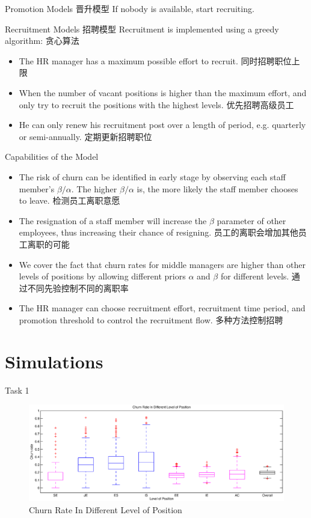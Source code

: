 \documentclass{beamer}
\begin{document}
\begin{CJK*}{UTF8}{gbsn}
\begin{frame}{Promotion Models 晋升模型}
If nobody is available, start recruiting.

\end{frame}

\begin{frame}{Recruitment Models 招聘模型}
Recruitment is implemented using a greedy algorithm: 贪心算法
\begin{itemize}
\item The HR manager has a maximum possible effort to recruit. 同时招聘职位上限
\item When the number of vacant positions is higher than the maximum effort, and only try to recruit the positions with the highest levels. 优先招聘高级员工
\item He can only renew his recruitment post over a length of period, e.g. quarterly or semi-annually. 定期更新招聘职位
\end{itemize}
\end{frame}

\begin{frame}{Capabilities of the Model}
\begin{itemize}
\item The risk of churn can be identified in early stage by observing each staff member's $\beta/\alpha$. The higher $\beta/\alpha$ is, the more likely the staff member chooses to leave. 检测员工离职意愿
\item The resignation of a staff member will increase the $\beta$ parameter of other employees, thus increasing their chance of resigning. 员工的离职会增加其他员工离职的可能
\item We cover the fact that churn rates for middle managers are higher than other levels of positions by allowing different priors $\alpha$ and $\beta$ for different levels. 通过不同先验控制不同的离职率
\item The HR manager can choose recruitment effort, recruitment time period, and promotion threshold to control the recruitment flow. 多种方法控制招聘
\end{itemize}
\end{frame}

\section{Simulations}
\begin{frame}{Task 1}

\begin{figure}
\centering
\includegraphics[width=\textwidth]{fig/task-1-1.eps}
\caption{Churn Rate In Different Level of Position}
\end{figure}


\end{frame}
\end{CJK*}
\end{document}
